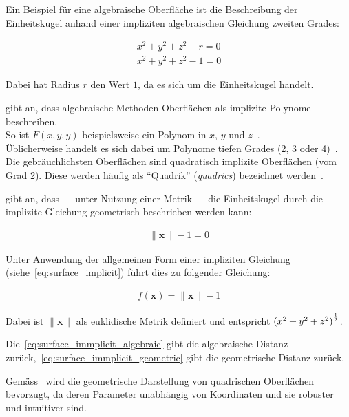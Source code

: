 Ein Beispiel für eine algebraische Oberfläche ist die Beschreibung der
Einheitskugel anhand einer impliziten algebraischen Gleichung zweiten Grades:

\begin{gather} \label{eq:surface_immplicit_algebraic}
    x^{2} + y^{2} + z^{2} - r = 0\\
    x^{2} + y^{2} + z^{2} - 1 = 0
\end{gather}

Dabei hat Radius $r$ den Wert $1$, da es sich um die Einheitskugel
handelt.

\citeauthor{menon_introduction_1996} gibt an, dass algebraische Methoden
Oberflächen als implizite Polynome beschreiben.\\
So ist $F(x, y, y)$ beispielsweise ein Polynom in $x$, $y$ und
$z$~\parencite[S.  2]{menon_introduction_1996}.\\
Üblicherweise handelt es sich dabei um Polynome tiefen Grades (2, 3 oder
4)~\parencite[S.  2]{menon_introduction_1996}.\\
Die gebräuchlichsten Oberflächen sind quadratisch implizite Oberflächen
(vom Grad 2). Diese werden häufig als ``Quadrik'' (\textit{quadrics})
bezeichnet werden~\parencite[S.  2]{menon_introduction_1996}.

\citeauthor{hart_sphere_1994} gibt an, dass --- unter Nutzung einer Metrik ---
die Einheitskugel durch die implizite Gleichung geometrisch beschrieben
werden kann:

\begin{gather}\label{eq:surface_immplicit_geometric}
    \|\bm{x}\| - 1 = 0
\end{gather}

Unter Anwendung der allgemeinen Form einer impliziten Gleichung
(siehe~\autoref{eq:surface_implicit}) führt dies zu folgender Gleichung:

\begin{gather}\label{eq:surface_implicit_sphere}
    f(\bm{x}) = \|\bm{x}\| - 1
\end{gather}


Dabei ist $\|\bm{x}\|$ als euklidische Metrik definiert und entspricht
${(x^{2} + y^{2} + z^{2})}^{1 \over 2}$.

Die~\autoref{eq:surface_immplicit_algebraic} gibt die algebraische
Distanz zurück,~\autoref{eq:surface_immplicit_geometric} gibt die
geometrische Distanz zurück.

Gemäss~\citeauthor{hart_sphere_1994} wird die geometrische Darstellung
von quadrischen Oberflächen bevorzugt, da deren Parameter unabhängig von
Koordinaten und sie robuster und intuitiver sind.

